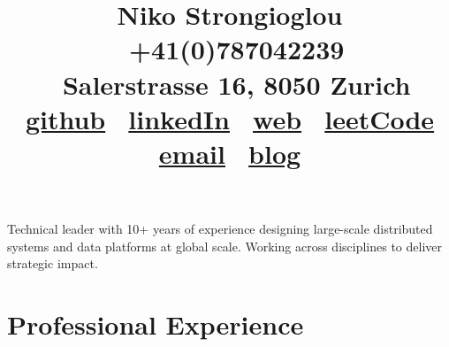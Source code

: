 \documentclass{article}
\begin{document}
    \title{ \raggedright
            \Huge{\vspace{-3.5cm} \color{NavyBlue}Niko Strongioglou } \\ \small{
            \faPhone \, +41(0)787042239 \\
            \faMapMarker \, Salerstrasse 16, 8050 Zurich \\
                \faGithub \, \href{https://github.com/tonyflow}{github} \quad
                \faLinkedin \, \href{https://www.linkedin.com/in/nikolaos-strongioglou/}{linkedIn} \quad
                \faGlobe \, \href{http://tonyflow.github.io/}{web} \quad
                \faUserSecret \, \href{https://leetcode.com/nikostr/}{leetCode} \quad
                \faEnvelope \, \href{mailto:nikos.strongioglou@gmail.com}{email} \quad
                \faCoffee \, \href{https://amemoiroffailures.hashnode.dev/}{blog}
        }
        }
    \author{}
    \date{}
    \maketitle
    
    \vspace{-1.4cm}
    \noindent
    Technical leader with 10+ years of experience designing large-scale distributed systems and data \newline platforms at global scale. Working across disciplines to deliver strategic impact. 


    \section*{\color{NavyBlue}Professional Experience}
    \vspace{-0.5cm} 
    {\color{NavyBlue}\hrulefill}
\end{document}
